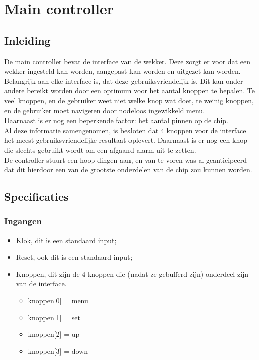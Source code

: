 \chapter{Main controller}
\section{Inleiding}
De main controller bevat de interface van de wekker. Deze zorgt er voor dat een wekker ingesteld kan worden, aangepast kan worden en uitgezet kan worden. Belangrijk aan elke interface is, dat deze gebruiksvriendelijk is. Dit kan onder andere bereikt worden door een optimum voor het aantal knoppen te bepalen. Te veel knoppen, en de gebruiker weet niet welke knop wat doet, te weinig knoppen, en de gebruiker moet navigeren door nodeloos ingewikkeld menu. \\
Daarnaast is er nog een beperkende factor: het aantal pinnen op de chip. \\
Al deze informatie samengenomen, is besloten dat 4 knoppen voor de interface het meest gebruiksvriendelijke resultaat oplevert. Daarnaast is er nog een knop die slechts gebruikt wordt om een afgaand alarm uit te zetten. \\
De controller stuurt een hoop dingen aan, en van te voren was al geanticipeerd dat dit hierdoor een van de grootste onderdelen van de chip zou kunnen worden.

\section{Specificaties}
\subsection{Ingangen}
\begin{itemize}[nolistsep]
\item Klok, dit is een standaard input;
\item Reset, ook dit is een standaard input;
\item Knoppen, dit zijn de 4 knoppen die (nadat ze gebufferd zijn) onderdeel zijn van de interface.
\begin{itemize}[nolistsep]
\item knoppen[0] = menu
\item knoppen[1] = set 
\item knoppen[2] = up
\item knoppen[3] = down\\
\end{itemize}
\end{itemize}



